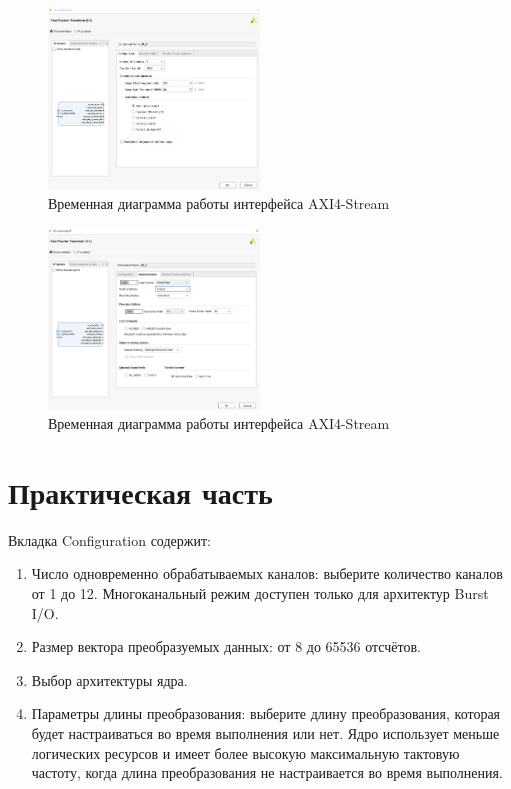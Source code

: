 \begin{figure}[h]
	\centering
	\includegraphics[width=0.5\textwidth]{image/fft_config.png}
	\caption{Временная диаграмма работы интерфейса AXI4-Stream}
	\label{fft_config}
\end{figure}
	
\begin{figure}[h]
	\centering
	\includegraphics[width=0.5\textwidth]{image/fft_implemetation.png}
	\caption{Временная диаграмма работы интерфейса AXI4-Stream}
	\label{fft_implemetation}
\end{figure}
	
\section{Практическая часть}

Вкладка Configuration содержит:
\begin{enumerate}
	\item Число одновременно обрабатываемых каналов: выберите количество каналов от 1 до 12. Многоканальный режим доступен только для архитектур Burst I/O.
	\item Размер вектора преобразуемых данных: от 8 до 65536 отсчётов.
	\item Выбор архитектуры ядра.
	\item Параметры длины преобразования: выберите длину преобразования, которая будет настраиваться во время выполнения или нет. Ядро использует меньше логических ресурсов и имеет более высокую максимальную тактовую частоту, когда длина преобразования не настраивается во время выполнения.
\end{enumerate}


